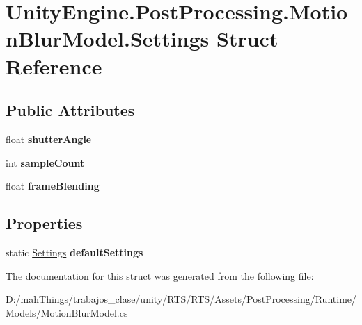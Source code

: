 \hypertarget{struct_unity_engine_1_1_post_processing_1_1_motion_blur_model_1_1_settings}{}\section{Unity\+Engine.\+Post\+Processing.\+Motion\+Blur\+Model.\+Settings Struct Reference}
\label{struct_unity_engine_1_1_post_processing_1_1_motion_blur_model_1_1_settings}
\subsection*{Public Attributes}
\begin{DoxyCompactItemize}
\item 
\mbox{\label{struct_unity_engine_1_1_post_processing_1_1_motion_blur_model_1_1_settings_aa87f06f32cbabf70b57bb5d1222a7289}} 
float {\bfseries shutter\+Angle}
\item 
\mbox{\label{struct_unity_engine_1_1_post_processing_1_1_motion_blur_model_1_1_settings_a5d2163b0f3cdf31d768131d211608523}} 
int {\bfseries sample\+Count}
\item 
\mbox{\label{struct_unity_engine_1_1_post_processing_1_1_motion_blur_model_1_1_settings_a1342d04370729632c1e169d6e909a601}} 
float {\bfseries frame\+Blending}
\end{DoxyCompactItemize}
\subsection*{Properties}
\begin{DoxyCompactItemize}
\item 
\mbox{\label{struct_unity_engine_1_1_post_processing_1_1_motion_blur_model_1_1_settings_a9cab7b33d1ea48a1a47b58d93958dbe0}} 
static \mbox{\hyperlink{struct_unity_engine_1_1_post_processing_1_1_motion_blur_model_1_1_settings}{Settings}} {\bfseries default\+Settings}
\end{DoxyCompactItemize}


The documentation for this struct was generated from the following file\+:\begin{DoxyCompactItemize}
\item 
D\+:/mah\+Things/trabajos\+\_\+clase/unity/\+R\+T\+S/\+R\+T\+S/\+Assets/\+Post\+Processing/\+Runtime/\+Models/Motion\+Blur\+Model.\+cs\end{DoxyCompactItemize}
